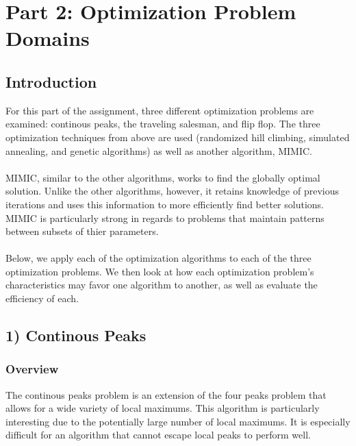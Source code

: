 \documentclass[h]{article}
\begin{document}
\section*{Part 2: Optimization Problem Domains}
\subsection*{ Introduction}  
For this part of the assignment, three different optimization problems are 
examined: continous peaks, the traveling salesman, and flip flop.  The three
optimization techniques from above are used (randomized hill climbing, simulated annealing, and genetic algorithms) 
as well as another algorithm, MIMIC.
\\ \\
MIMIC, similar to the other algorithms, works to find the globally optimal 
solution.  Unlike the other algorithms, however, it retains knowledge of previous 
iterations and uses this information to more efficiently find better solutions.  MIMIC is particularly strong in regards to 
problems that maintain patterns between subsets of thier parameters.
\\ \\
Below, we apply each of the optimization algorithms to each of the three optimization 
problems.  We then look at how each optimization problem's characteristics may 
favor one algorithm to another, as well as evaluate the efficiency of each.

\subsection*{1) Continous Peaks}  
\subsubsection*{Overview}
The continous peaks problem is an extension of the four peaks problem that 
allows for a wide variety of local maximums.  This algorithm is particularly interesting due to the potentially large 
number of local maximums.  It is especially difficult for an algorithm that cannot escape 
local peaks to perform well.
\end{document}
